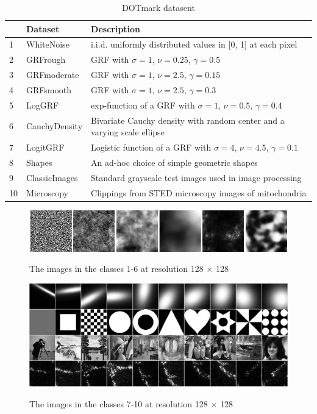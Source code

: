 \vspace{5ex}
\begin{table}[htbp]
	\caption{DOTmark datasent}
	\centering
	\begin{tabular}[width=1.0\linewidth]{lll}
		\toprule
		\quad  & Dataset & Description\\
    \midrule
            1  & WhiteNoise    & i.i.d. uniformly distributed values in [0, 1] at each pixel\\
            2  & GRFrough      & GRF with $\sigma = 1$, $\nu = 0.25$, $\gamma = 0.5$\\
            3  & GRFmoderate   & GRF with $\sigma = 1$, $\nu = 2.5$, $\gamma = 0.15$\\
            4  & GRFsmooth     & GRF with $\sigma = 1$, $\nu = 2.5$, $\gamma = 0.3$\\
            5  & LogGRF        & exp-function of a GRF with $\sigma = 1$, $\nu = 0.5$, $\gamma = 0.4$\\
            6  & CauchyDensity & Bivariate Cauchy density with random center and a varying scale ellipse\\
            7  & LogitGRF      & Logistic function of a GRF with $\sigma = 4$, $\nu = 4.5$, $\gamma = 0.1$\\
            8  & Shapes        & An ad-hoc choice of simple geometric shapes\\
            9  & ClassicImages & Standard grayscale test images used in image processing\\
            10 & Microscopy    & Clippings from STED microscopy images of mitochondria\\
        \bottomrule
	\end{tabular}
	\label{tab:tabledot}
\end{table}

\begin{figure}[htbp]
    \centering
    \includegraphics[width=0.9\linewidth]{img/dot_1to6}
    \label{fig:ot}
    \caption{The images in the classes 1-6 at resolution 128 $\times$ 128}
\end{figure}

\begin{figure}[htbp]
    \centering
    \includegraphics[width=0.9\linewidth]{img/dot_7to10}
    \label{fig:ot}
    \caption{The images in the classes 7-10 at resolution 128 $\times$ 128}
\end{figure}

